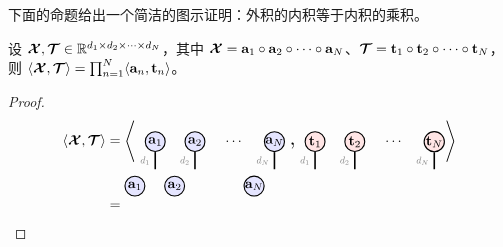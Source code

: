 下面的命题给出一个简洁的图示证明：外积的内积等于内积的乘积。
\begin{proposition}
    设 $\bm{\mathcal{X}},\bm{\mathcal{T}}\in\mathbb{R}^{d_1\times d_2\times\cdots\times d_N}$，其中 $\bm{\mathcal{X}} = \mathbf{a}_1\circ\mathbf{a}_2\circ\cdots\circ\mathbf{a}_N$、$\bm{\mathcal{T}} = \mathbf{t}_1\circ\mathbf{t}_2\circ\cdots\circ\mathbf{t}_N$，则 $\langle\bm{\mathcal{X}},\bm{\mathcal{T}}\rangle = \prod_{n=1}^N\langle\mathbf{a}_n,\mathbf{t}_n\rangle$。
\begin{proof}
\begin{align*}
\langle\Xt,\Tt\rangle
&=
\left\langle\begin{tikzpicture}[baseline=\baseline]
    \tikzset{tensor/.style = {minimum size = 0.5cm,shape = circle,thick,draw=black,inner sep = 0pt}, edge/.style   = {thick,line width=.4mm}}
    \def\y{0}
     \def\x{0}
\node[tensor,fill=blue!10!white] (a1) at (\x,\y){$\ab_1$};
\node[tensor,fill=blue!10!white](a2) at (\x+1,\y){$\ab_2$};
  \node[tensor,fill=blue!10!white](an) at (\x+3,\y){$\ab_N$};
    \draw[edge] (a1) -- (\x,\y-0.7) node [midway, left] {\scalebox{0.7}{\dimcolor{$d_1$}}};
    \draw[edge] (a2) -- (\x+1,\y-0.7) node [midway, left] {\scalebox{0.7}{\dimcolor{$d_2$}}};
    \draw[edge] (an) -- (\x+3,\y-0.7)  node [midway, left] {\scalebox{0.7}{\dimcolor{$d_N$}}};
    \node (eq) at (\x+2,\y) {$\cdots$};
\end{tikzpicture} \ \scalebox{1.5}{,}
\begin{tikzpicture}[baseline=\baseline]
    \tikzset{tensor/.style = {minimum size = 0.5cm,shape = circle,thick,draw=black,inner sep = 0pt}, edge/.style   = {thick,line width=.4mm}}
    \def\y{0}
     \def\x{0}
\node[tensor,fill=red!10!white] (t1) at (\x,\y){$\tb_1$};
\node[tensor,fill=red!10!white](t2) at (\x+1,\y){$\tb_2$};
  \node[tensor,fill=red!10!white](tn) at (\x+3,\y){$\tb_N$};
    \draw[edge] (t1) -- (\x,\y-0.7) node [midway, left] {\scalebox{0.7}{\dimcolor{$d_1$}}};
    \draw[edge] (t2) -- (\x+1,\y-0.7) node [midway, left] {\scalebox{0.7}{\dimcolor{$d_2$}}};
    \draw[edge] (tn) -- (\x+3,\y-0.7)  node [midway, left] {\scalebox{0.7}{\dimcolor{$d_N$}}};
    \node (eq) at (\x+2,\y) {$\cdots$};
\end{tikzpicture} 
\right\rangle\\
&=
\begin{tikzpicture}[baseline=\baseline]
    \tikzset{tensor/.style = {minimum size = 0.5cm,shape = circle,thick,draw=black,inner sep = 0pt}, edge/.style   = {thick,line width=.4mm}}
    \def\y{0}
     \def\x{0}
\node[tensor,fill=blue!10!white] (a1) at (\x,\y+0.5){$\ab_1$};
\node[tensor,fill=blue!10!white](a2) at (\x+1,\y+0.5){$\ab_2$};
  \node[tensor,fill=blue!10!white](an) at (\x+3,\y+0.5){$\ab_N$};

\end{tikzpicture}
\end{align*}
\end{proof}
\end{proposition}
